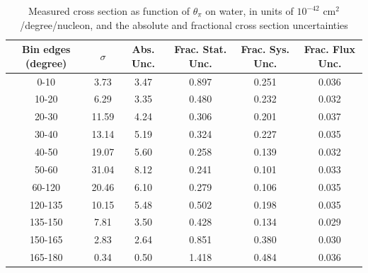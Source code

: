 \documentclass[../main.tex]{subfiles}
\begin{document}
\begin{table}
  \centering
  \renewcommand{\arraystretch}{1.15}
  \caption{Measured cross section as function of $\theta_{\pi}$ on water, in units of $10^{-42}$ $\text{cm}^2$/degree/nucleon, and the absolute and fractional cross section uncertainties}
    \begin{tabular}{c||c|c||c|c|c}
      Bin edges (degree) &  $\sigma$  &  Abs. Unc.  &  Frac. Stat. Unc.  &  Frac. Sys. Unc.  &  Frac. Flux Unc. \\
      \hline
      \hline
      0-10 & 3.73 & 3.47 & 0.897 & 0.251 & 0.036\\
      10-20 & 6.29 & 3.35 & 0.480 & 0.232 & 0.032\\
      20-30 & 11.59 & 4.24 & 0.306 & 0.201 & 0.037\\
      30-40 & 13.14 & 5.19 & 0.324 & 0.227 & 0.035\\
      40-50 & 19.07 & 5.60 & 0.258 & 0.139 & 0.032\\
      50-60 & 31.04 & 8.12 & 0.241 & 0.101 & 0.033\\
      60-120 & 20.46 & 6.10 & 0.279 & 0.106 & 0.035\\
      120-135 & 10.15 & 5.48 & 0.502 & 0.198 & 0.035\\
      135-150 & 7.81 & 3.50 & 0.428 & 0.134 & 0.029\\
      150-165 & 2.83 & 2.64 & 0.851 & 0.380 & 0.030\\
      165-180 & 0.34 & 0.50 & 1.418 & 0.484 & 0.036
    \end{tabular}
  \label{tbl:datanucleonnuc10pion_thetaa}
\end{table}
\pagebreak
\end{document}
